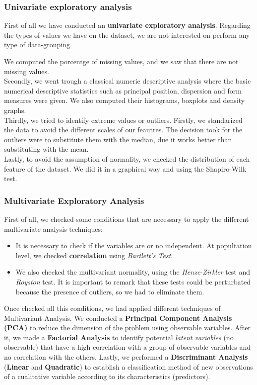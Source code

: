 \documentclass[10pt,a4paper]{article}
\theoremstyle{definition}
\theoremstyle{definition}
\begin{document}
\subsubsection{Univariate exploratory analysis}
First of all we have conducted an \textbf{univariate exploratory analysis}. Regarding the types of values we have on the dataset, we are not interested on perform any type of data-grouping.

We computed the porcentge of missing values, and we saw that there are not missing values. \\

Secondly, we went trough a classical numeric descriptive analysis where the basic numerical descriptive statistics such as principal position, dispersion and form measures were given. We also computed their histograms, boxplots and density graphs. \\

Thirdly, we tried to identify extreme values or outliers. Firstly, we standarized the data to avoid the different scales of our feautres. The decision took for the outliers were to substitute them with the median, due it works better than substituting with the mean. \\

Lastly, to avoid the assumption of normality, we checked the distribution of each feature of the dataset. We did it in a graphical way and using the Shapiro-Wilk test.

\subsubsection{Multivariate Exploratory Analysis}
First of all, we checked some conditions that are necessary to apply the different multivariate analysis techniques:

\begin{itemize}
	\item It is necessary to check if the variables are or no independent. At popultation level, we checked \textbf{correlation} using \textit{Bartlett's Test}.
	\item We also checked the multivariant normality, using the \textit{Henze-Zirkler} test and \textit{Royston} test. It is important to remark that these tests could be perturbated because the presence of outliers, so we had to eliminate them.
\end{itemize}

Once checked all this conditions, we had applied different techniques of Multivariant Analysis. We conducted a \textbf{Principal Component Analysis (PCA)} to reduce the dimension of the problem using observable  variables. After it, we made a \textbf{Factorial Analysis} to identify potential \textit{latent variables} (no observable) that have a high correlation with a group of observable variables and no correlation with the others. Lastly, we performed a \textbf{Discriminant Analysis} (\textbf{Linear} and \textbf{Quadratic}) to establish a classification method of new observations of a cualitative variable according to its characteristics (predictors).
\end{document}

